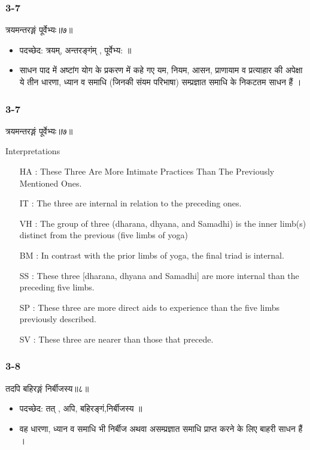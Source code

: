 \begin{frame}[fragile]\frametitle{3-7}
\begin{sanskrit}
त्रयमन्तरङ्गं पूर्वेभ्यः॥७॥
\end{sanskrit}

\begin{itemize}
\item पदच्छेद: त्रयम्, अन्तरङ्गंम् , पूर्वेभ्य: ॥
\item साधन पाद में अष्टांग योग के प्रकरण में कहे गए यम, नियम, आसन, प्राणायाम व प्रत्याहार की अपेक्षा ये तीन धारणा, ध्यान व समाधि (जिनकी संयम परिभाषा) सम्प्रज्ञात समाधि के निकटतम साधन हैं ।
\end{itemize}
\end{frame}


\begin{frame}[fragile]\frametitle{3-7}
\begin{sanskrit}
त्रयमन्तरङ्गं पूर्वेभ्यः॥७॥
\end{sanskrit}

Interpretations
\begin{itemize}	
\item [HA]: These Three Are More Intimate Practices Than The Previously Mentioned Ones.
\item [IT]: The three are internal in relation to the preceding ones.
\item [VH]: The group of three (dharana, dhyana, and Samadhi) is the inner limb(s) distinct from the previous (five limbs of yoga)
\item [BM]: In contrast with the prior limbs of yoga, the final triad is internal.
\item [SS]: These three [dharana, dhyana and Samadhi] are more internal than the preceding five limbs.
\item [SP]: These three are more direct aids to experience than the five limbs previously described.
\item [SV]: These three are nearer than those that precede. 
\end{itemize}
\end{frame}

\begin{frame}[fragile]\frametitle{3-8}
\begin{sanskrit}
तदपि बहिरङ्गं निर्बीजस्य॥८॥
\end{sanskrit}

\begin{itemize}
\item पदच्छेद:  तत् , अपि, बहिरङ्गं,निर्बीजस्य ॥
\item वह धारणा, ध्यान व समाधि भी निर्बीज अथवा असम्प्रज्ञात समाधि प्राप्त करने के लिए बाहरी साधन हैं ।
\end{itemize}
\end{frame}



